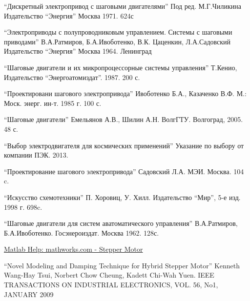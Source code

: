 \newpage
\begin{thebibliography}{20}

     ``Дискретный электропривод с шаговыми двигателями'' Под ред. М.Г.Чиликина
                        Издательство ``Энергия'' Москва 1971. 624с

     ``Электроприводы с полупроводниковым управлением. Системы с шаговыми приводами''
                                    В.А.Ратмиров, Б.А.Ивоботенко, В.К. Цаценкин, Л.А.Садовский
                                    Издательство ``Энергия'' Москва 1964. Ленинград

     ``Шаговые двигатели и их микропроцессорные системы управления'' Т.Кенио,
                    Издательство ``Энергоатомиздат''. 1987. 200 с.

     ``Проектировани шагового электропривода''
                                    Ивоботенко Б.А., Казаченко В.Ф. М.:
                                    Моск. энерг. ин-т. 1985 г. 100 с.

     ``Шаговые двигатели''
                                Емельянов А.В., Шилин А.Н.
                                ВолгГТУ. Волгоград, 2005. 48 с.

     ``Выбор электродвигателя для космических применений''
                                        Указание по выбору от компании ПЭК. 2013.

     ``Проектирование шагового электропривода''
                        Садовский Л.А. МЭИ. Москва. 104 c.

     ``Искусство схемотехники''
                            П. Хоровиц, У. Хилл.
                            Издательство ``Мир'', 5-е изд. 1998 г. 698c.

     ``Шаговые двигатели для систем аватоматического управления''
                                                В.А.Ратмиров, Б.А.Ивоботенко.
                                                Госэнероиздат. Москва 1962. 128с.

     \href{http://www.mathworks.com/help/physmod/sps/powersys/ref/steppermotor.html}
                                            {Matlab Help: mathworks.com - Stepper Motor}

     ``Novel Modeling and Damping Technique for Hybrid Stepper Motor''
                                            Kenneth Wang-Hay Tsui, Norbert Chow Cheung, Kadett Chi-Wah Yuen.
                                            IEEE TRANSACTIONS ON INDUSTRIAL ELECTRONICS, VOL. 56, No1, JANUARY 2009


\end{thebibliography}
